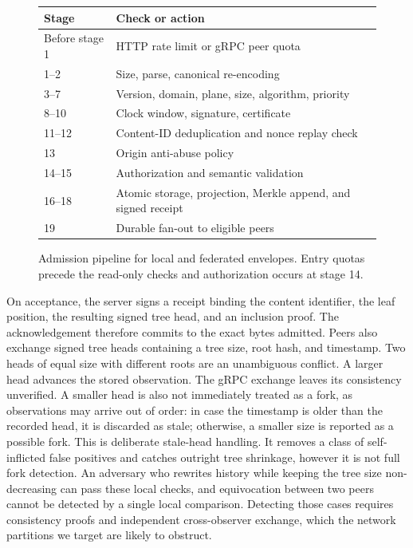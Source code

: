 \documentclass[conference,a4paper,10pt]{IEEEtran}
\begin{document}
\begin{figure}[!t]
  \centering
  {\normalsize
  \begin{tabularx}{\columnwidth}{@{}l>{\raggedright\arraybackslash}X@{}}
    \toprule
    \textbf{Stage} & \textbf{Check or action} \\
    \midrule
    Before stage 1 & HTTP rate limit or gRPC peer quota \\
    \midrule
    1--2 & Size, parse, canonical re-encoding \\
    3--7 & Version, domain, plane, size, algorithm, priority \\
    8--10 & Clock window, signature, certificate \\
    11--12 & Content-ID deduplication and nonce replay check \\
    \midrule
    13 & Origin anti-abuse policy \\
    14--15 & Authorization and semantic validation \\
    16--18 & Atomic storage, projection, Merkle append, and signed receipt \\
    19 & Durable fan-out to eligible peers \\
    \bottomrule
  \end{tabularx}}
  \caption{Admission pipeline for local and federated envelopes. Entry quotas precede the read-only checks and authorization occurs at stage 14.}
  \label{fig:pipeline}
\end{figure}

On acceptance, the server signs a receipt binding the content identifier, the
leaf position, the resulting signed tree head, and an inclusion proof. The
acknowledgement therefore commits to the exact bytes admitted. Peers also exchange signed tree heads containing
a tree size, root hash, and timestamp. Two heads of equal size with different
roots are an unambiguous conflict. A larger head advances the stored observation. The gRPC exchange leaves its consistency unverified. A smaller
head is also not immediately treated as a fork, as observations may arrive out
of order: in case the timestamp is older than the recorded head, it is discarded as
stale; otherwise, a smaller size is reported as a possible fork. This is
deliberate stale-head handling. It removes a class of self-inflicted false
positives and catches outright tree shrinkage, however it is not full fork
detection. An adversary who rewrites history while keeping the tree size
non-decreasing can pass these local checks, and equivocation between two peers
cannot be detected by a single local comparison. Detecting those cases requires
consistency proofs and independent cross-observer exchange, which the network
partitions we target are likely to obstruct.
\end{document}
